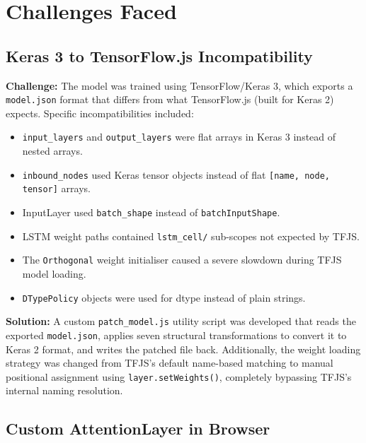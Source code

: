 ﻿%
\chapter{Challenges Faced}

\section{Keras 3 to TensorFlow.js Incompatibility}

\textbf{Challenge:} The model was trained using TensorFlow/Keras 3, which exports a \texttt{model.\allowbreak{}json} format that differs from what TensorFlow.js (built for Keras 2) expects. Specific incompatibilities included:
\begin{itemize}[leftmargin=1.5em]
  \item \texttt{input\_\allowbreak{}layers} and \texttt{output\_\allowbreak{}layers} were flat arrays in Keras 3 instead of nested arrays.
  \item \texttt{inbound\_\allowbreak{}nodes} used Keras tensor objects instead of flat \texttt{[name,\allowbreak{} node,\allowbreak{} tensor]} arrays.
  \item InputLayer used \texttt{batch\_\allowbreak{}shape} instead of \texttt{batchInputShape}.
  \item LSTM weight paths contained \texttt{lstm\_\allowbreak{}cell/\allowbreak{}} sub-scopes not expected by TFJS.
  \item The \texttt{Orthogonal} weight initialiser caused a severe slowdown during TFJS model loading.
  \item \texttt{DTypePolicy} objects were used for dtype instead of plain strings.
\end{itemize}

\textbf{Solution:} A custom \texttt{patch\_\allowbreak{}model.\allowbreak{}js} utility script was developed that reads the exported \texttt{model.\allowbreak{}json}, applies seven structural transformations to convert it to Keras 2 format, and writes the patched file back. Additionally, the weight loading strategy was changed from TFJS's default name-based matching to manual positional assignment using \texttt{layer.\allowbreak{}setWeights()}, completely bypassing TFJS's internal naming resolution.

\section{Custom AttentionLayer in Browser}

